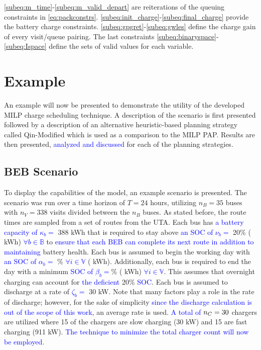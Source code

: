 \documentclass[utf8]{FrontiersinHarvard}
\newcommand{\A}{35 }                                                            %
\newcommand{\N}{338 }                                                           %
\newcommand{\acharge}{0.9}                                                      %
\newcommand{\bcharge}{0.7 }                                                     %
\newcommand{\mincharge}{20\% }                                                  %
\newcommand{\minchargeD}{0.20 }                                                 %
\newcommand{\batsize}{388 }                                                     %
\newcommand{\fast}{15 }                                                         %
\newcommand{\slow}{15 }                                                         %
\newcommand{\fasts}{911 }                                                       %
\newcommand{\slows}{30 }                                                        %
\begin{document}
\autoref{subeq:m_time}-\autoref{subeq:m_valid_depart} are reiterations of the queuing constraints in
\autoref{eq:packconstrs}. \autoref{subeq:init_charge}-\autoref{subeq:final_charge} provide the battery charge
constraints. \autoref{subeq:gpgret}-\autoref{subeq:gwles} define the charge gain of every visit/queue pairing. The last
constraints \autoref{subeq:binaryspace}-\autoref{subeq:Ispace} define the sets of valid values for each variable.
\section{Example}
\label{sec:example}
An example will now be presented to demonstrate the utility of the developed MILP charge scheduling technique. A
description of the scenario is first presented followed by a description of an alternative heuristic-based planning
strategy called Qin-Modified which is used as a comparison to the MILP PAP. Results are then presented,
\textcolor{blue}{analyzed and discussed} for each of the planning strategies.

\subsection{BEB Scenario}
\label{beb-scenario}
To display the capabilities of the model, an example scenario is presented. The scenario was run over a time horizon of
\(T=24\) hours, utilizing \(n_B = \A\) buses with \(n_V = \N\) visits divided between the \(n_B\) buses. As stated before, the
route times are sampled from a set of routes from the UTA. Each bus has \textcolor{blue}{a battery capacity of $\kappa_b =$} \batsize kWh that is required to stay above \textcolor{blue}{an SOC of $\nu_b =$}
\mincharge (\fpeval{\batsize * \minchargeD} kWh) \textcolor{blue}{$\forall b \in \mathbb{B}$} to
\textcolor{blue}{ensure that each BEB can complete its next route in addition to maintaining} battery health.
Each bus is assumed to begin the working day with \textcolor{blue}{an SOC of $\alpha_b = $}
\fpeval{\acharge*100}\% \textcolor{blue}{$\forall i \in \mathbb{V}$} (\fpeval{\acharge * \batsize} kWh).
Additionally, each bus is required to end the day with a minimum \textcolor{blue}{ SOC of $\beta_b = $}\fpeval{\bcharge * 100}\% (\fpeval{\bcharge * \batsize} kWh) \textcolor{blue}{$\forall i \in \mathbb{V}$}. This assumes that overnight charging can account for \textcolor{blue}{the deficient} 20\%
\textcolor{blue}{SOC}. Each bus is assumed to discharge at a rate of \textcolor{blue}{$\zeta_b = $} 30
kW. Note that many factors play a role in the rate of discharge; however, for the sake of simplicity
\textcolor{blue}{since the discharge calculation is out of the scope of this work}, an average rate is used.
\textcolor{blue}{A total of} \(n_C = \fpeval{\fast + \slow}\) chargers are utilized where \slow of the chargers
are slow charging (\slows kW) and \fast are fast charging (\fasts kW). \textcolor{blue}{The technique to minimize the total charger count will now be employed}.
\end{document}
